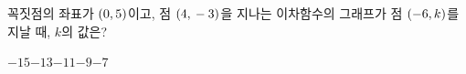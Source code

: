 \hspace*{2mm}\begin{minipage}[t]{\dimexpr\linewidth-2mm\relax}\vspace{0pt}
꼭짓점의 좌표가 $(0{,}\mkern3mu 5)$이고, 점 $(4{,}\mkern3mu -3)$을 지나는 이차함수의 그래프가 점 $(-6{,}\mkern3mu k)$를 지날 때, $k$의 값은?
\begin{choices32}{$-15$}{$-13$}{$-11$}{$-9$}{$-7$}\end{choices32}\end{minipage}
